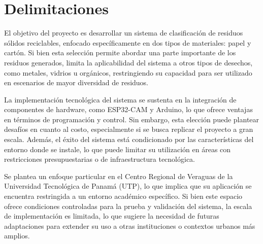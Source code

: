\section{Delimitaciones}
El objetivo del proyecto es desarrollar un sistema de clasificación de residuos sólidos reciclables, enfocado específicamente en dos tipos de materiales: papel y cartón. Si bien esta selección permite abordar una parte importante de los residuos generados, limita la aplicabilidad del sistema a otros tipos de desechos, como metales, vidrios u orgánicos, restringiendo su capacidad para ser utilizado en escenarios de mayor diversidad de residuos.

La implementación tecnológica del sistema se sustenta en la integración de componentes de hardware, como ESP32-CAM y Arduino, lo que ofrece ventajas en términos de programación y control. Sin embargo, esta elección puede plantear desafíos en cuanto al costo, especialmente si se busca replicar el proyecto a gran escala. Además, el éxito del sistema está condicionado por las características del entorno donde se instale, lo que puede limitar su utilización en áreas con restricciones presupuestarias o de infraestructura tecnológica. 

Se plantea un enfoque particular en el Centro Regional de Veraguas de la Universidad Tecnológica de Panamá (UTP), lo que implica que su aplicación se encuentra restringida a un entorno académico específico. Si bien este espacio ofrece condiciones controladas para la prueba y validación del sistema, la escala de implementación es limitada, lo que sugiere la necesidad de futuras adaptaciones para extender su uso a otras instituciones o contextos urbanos más amplios.